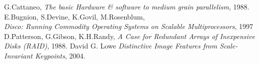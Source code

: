 \begin{thebibliography}{9}
  G.Cattaneo, \textit{The basic Hardware \& software to medium grain parallelism}, 1988.
  E.Bugnion, S.Devine, K.Govil, M.Rosenblum, \\ \textit{Disco: Running Commodity Operating Systems on Scalable Multiprocessors}, 1997
  D.Patterson, G.Gibson, K.H.Randy, \textit{A Case for Redundant Arrays of Inexpensive Disks (RAID)}, 1988.
  David G. Lowe \textit{Distinctive Image Features from Scale-Invariant Keypoints}, 2004.
\end{thebibliography}
